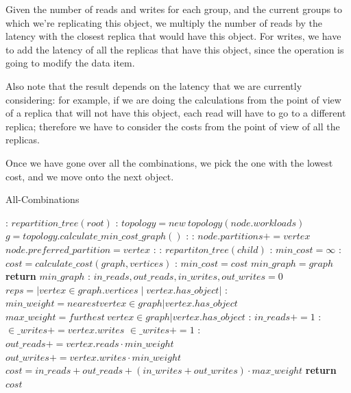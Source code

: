Given the number of reads and writes for each group, and the current groups to which we're replicating this object, we multiply the number of reads by the latency with the closest replica that would have this object. For writes, we have to add the latency of all the replicas that have this object, since the operation is going to modify the data item.

Also note that the result depends on the latency that we are currently considering: for example, if we are doing the calculations from the point of view of a replica that will not have this object, each read will have to go to a different replica; therefore we have to consider the costs from the point of view of all the replicas.

Once we have gone over all the combinations, we pick the one with the lowest cost, and we move onto the next object.

\begin{algorithm}
  \caption{All-Combinations}\label{alg:all-combinations}
  \begin{algorithmic}[1]
  :
  \State $repartition\_tree(root)$
  \EndFunction
  :
      \State $topology = new\ topology(node.workloads)$
      \State $g = topology.calculate\_min\_cost\_graph()$
      :
        :
        \State $node.partitions += vertex$
            \State $node.preferred\_partition = vertex$
          \EndIf
        \EndIf
      \EndFor
    \EndIf
    :
      :
        \State $repartiton\_tree(child)$
        \EndFor
    \EndIf
    \EndFunction
    :
    \State $min\_cost = \infty$
      :
        \State $cost = calculate\_cost(graph, vertices)$
        :
          \State $min\_cost = cost$
          \State $min\_graph = graph$
        \EndIf
      \EndFor
    \State \textbf{return} $min\_graph$
    \EndFunction
    :
      \State $in\_reads, out\_reads, in\_writes, out\_writes = 0$
      \State $reps = |vertex \in graph.vertices \mid vertex.has\_object|$
      :
      \State $min\_weight = nearest vertex \in graph | vertex.has\_object$
      \State $max\_weight = furthest\ vertex \in graph | vertex.has\_object$
        :
          \State $in\_reads+= 1$
          :
          \State $\in\_writes+= vertex.writes$
          \Else
          \State  $\in\_writes+= 1 $
          \EndIf
        \Else:
          \State $out\_reads += vertex.reads \cdot min\_weight$
          \State $out\_writes += vertex.writes \cdot min\_weight$
        \EndIf
      \EndFor
      \State $cost = in\_reads+ out\_reads + (in\_writes+ out\_writes) \cdot max\_weight$
      \State \textbf{return} $cost$
  \EndFunction
  \end{algorithmic}
  \end{algorithm}

